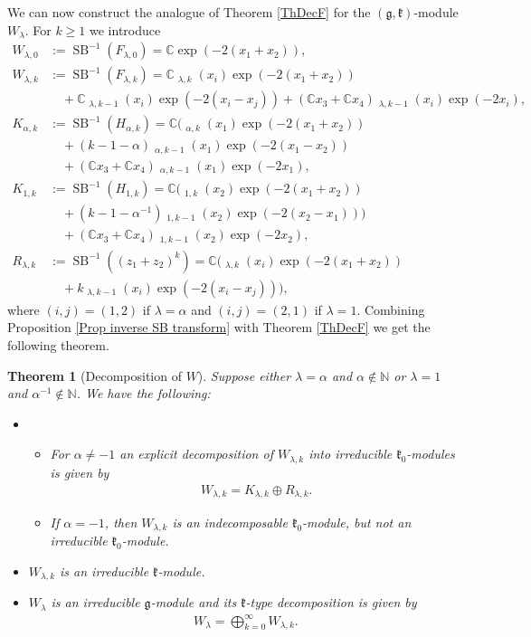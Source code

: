 \documentclass{amsart}
\newtheorem{theorem}{Theorem}
\numberwithin{theorem}{section}
\theoremstyle{definition}
\theoremstyle{remark}
\def\N{\mathds{N} }
\def\C{\mathds{C} }
\DeclareMathOperator{\KO}{\widetilde U}
\DeclareMathOperator{\KV}{\widetilde V}
\DeclareMathOperator{\rSB}{SB}
\newcommand{\irSB}{\rSB^{-1}}
\newcommand{\mf}[1]{\mathfrak{#1}}
\begin{document}
We can now construct the analogue of Theorem \ref{ThDecF} for the $(\mf g, \mf k)$-module $W_\lambda$. For $k\geq 1$ we introduce
\begin{align*}
W_{\lambda,0} &:= \irSB(F_{\lambda,0}) = \C\exp(-2(x_1+x_2)),\\
W_{\lambda,k} &:= \irSB(F_{\lambda,k}) = \C \KO_{\lambda,k}(x_i)\exp(-2(x_1+x_2))\\
&\quad + \C \KO_{\lambda,k-1}(x_i)\exp(-2(x_i-x_j)) +(\C x_3 + \C x_4)\KV_{\lambda,k-1}(x_i)\exp(-2x_i),\\
K_{\alpha, k} &:= \irSB(H_{\alpha,k}) = \C (\KO_{\alpha,k}(x_1)\exp(-2(x_1+x_2))\\
&\quad +(k-1-\alpha)\KO_{\alpha,k-1}(x_1)\exp(-2(x_1-x_2)) \\
&\quad + (\C x_3 + \C x_4)\KV_{\alpha,k-1}(x_1)\exp(-2x_1),\\
K_{1, k} &:= \irSB(H_{1,k}) = \C (\KO_{1,k}(x_2)\exp(-2(x_1+x_2))\\
&\quad +(k-1-\alpha^{-1})\KO_{1,k-1}(x_2)\exp(-2(x_2-x_1)) ) \\
&\quad + (\C x_3 + \C x_4)\KV_{1,k-1}(x_2)\exp(-2x_2),\\
R_{\lambda,k} &:= \irSB((z_1+z_2)^k) = \C (\KO_{\lambda,k}(x_i)\exp(-2(x_1+x_2)) \\
&\quad +k\KO_{\lambda,k-1}(x_i)\exp(-2(x_i-x_j)) ),
\end{align*}
where $(i,j)=(1,2)$ if $\lambda=\alpha$ and $(i,j)=(2,1)$ if $\lambda=1$. Combining Proposition \ref{Prop inverse SB transform} with Theorem \ref{ThDecF} we get the following theorem.

\begin{theorem}[Decomposition of $W$]\label{ThDecW}
Suppose either $\lambda=\alpha$ and $\alpha\not\in \N$ or $\lambda=1$ and $\alpha^{-1}\not\in \N$. We have the following:
\begin{itemize}
\item[(1)] \begin{itemize}
\item[(a)] For $\alpha\neq -1$ an explicit decomposition of $W_{\lambda,k}$ into irreducible $\mathfrak{k}_{0}$-modules is given by
\begin{align*}
W_{\lambda,k} = K_{\lambda,k} \oplus R_{\lambda,k}.
\end{align*}
\item[(b)] If $\alpha=-1$, then $W_{\lambda,k}$ is an indecomposable $\mf k_0$-module, but not an irreducible $\mf k_0$-module.
\end{itemize}
\item[(2)]$W_{\lambda,k}$ is an irreducible $\mf k$-module.
\item[(3)]$W_\lambda$ is an irreducible $\mathfrak{g}$-module and its $\mf k$-type decomposition is given by
\begin{align*}
W_{\lambda} = \bigoplus_{k=0}^\infty W_{\lambda,k}.
\end{align*}
\end{itemize}
\end{theorem}
\end{document}
